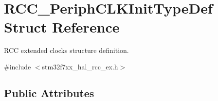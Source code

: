 \hypertarget{struct_r_c_c___periph_c_l_k_init_type_def}{}\section{R\+C\+C\+\_\+\+Periph\+C\+L\+K\+Init\+Type\+Def Struct Reference}
\label{struct_r_c_c___periph_c_l_k_init_type_def}


R\+CC extended clocks structure definition.  




{\ttfamily \#include $<$stm32f7xx\+\_\+hal\+\_\+rcc\+\_\+ex.\+h$>$}

\subsection*{Public Attributes}
